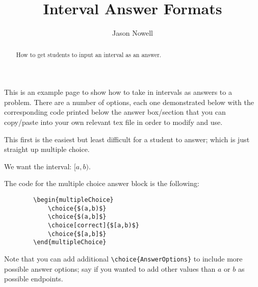 \documentclass{ximera}
\title{Interval Answer Formats}
\author{Jason Nowell}
\begin{document}
\begin{abstract}
How to get students to input an interval as an answer.
\end{abstract}
\maketitle

This is an example page to show how to take in intervals as answers to a problem. There are a number of options, each one demonstrated below with the corresponding code printed below the answer box/section that you can copy/paste into your own relevant tex file in order to modify and use.


\begin{problem}

    This first is the easiest but least difficult for a student to answer; which is just straight up multiple choice.
    
    We want the interval: $[a,b)$.
    
    \begin{multipleChoice}
        \choice{$(a,b]$}
        \choice[correct]{$[a,b)$}
        \choice{$[a,b]$}
    \end{multipleChoice}
    
    The code for the multiple choice answer block is the following:
    \begin{verbatim}
        \begin{multipleChoice}
            \choice{$(a,b)$}
            \choice{$(a,b]$}
            \choice[correct]{$[a,b)$}
            \choice{$[a,b]$}
        \end{multipleChoice}
    \end{verbatim}
    Note that you can add additional \verb|\choice{AnswerOptions}| to include more possible answer options; say if you wanted to add other values than $a$ or $b$ as possible endpoints.
\end{problem}
\end{document}
